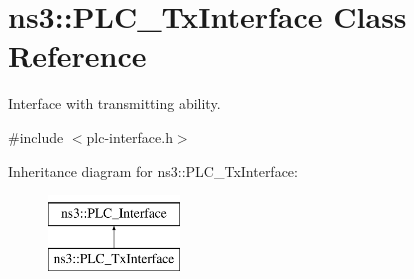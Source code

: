 \hypertarget{classns3_1_1PLC__TxInterface}{\section{ns3\-:\-:\-P\-L\-C\-\_\-\-Tx\-Interface \-Class \-Reference}
\label{classns3_1_1PLC__TxInterface}
}


\-Interface with transmitting ability.  




{\ttfamily \#include $<$plc-\/interface.\-h$>$}

\-Inheritance diagram for ns3\-:\-:\-P\-L\-C\-\_\-\-Tx\-Interface\-:\begin{figure}[H]
\begin{center}
\leavevmode
\includegraphics[height=2.000000cm]{classns3_1_1PLC__TxInterface}
\end{center}
\end{figure}
